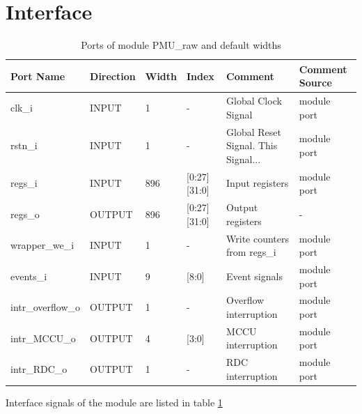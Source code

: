 \section{Interface}\label{interface}
\label{chapter 4}

\begin{table}[ht]
	\scriptsize
	\centering
	\begin{tabular}{llllll}
		\hline
		Port Name & Direction & Width & Index & Comment & Comment Source
		\\
		\hline
		clk\_i & INPUT & 1 & - & Global Clock Signal & module port
		\\
		rstn\_i & INPUT & 1 & - & Global Reset Signal. This Signal... & module port
		\\
		regs\_i & INPUT & 896 & [0:27][31:0] & Input registers & module port
		\\
		regs\_o & OUTPUT & 896 & [0:27][31:0] & Output registers & -\\
		wrapper\_we\_i & INPUT & 1 & - & Write counters from regs\_i & module port
		\\
		events\_i & INPUT & 9 & [8:0] & Event signals & module port
		\\
		intr\_overflow\_o & OUTPUT & 1 & - & Overflow interruption & module port
		\\
		intr\_MCCU\_o & OUTPUT & 4 & [3:0] & MCCU interruption  & module port
		\\
		intr\_RDC\_o & OUTPUT & 1 & - & RDC interruption  & module port
		\\
		\hline
	\end{tabular}
	\caption{Ports of module PMU\_raw and default widths}
	\label{port:PMU_raw}
\end{table}

Interface signals of the module are listed in table \ref{port:PMU_raw}

